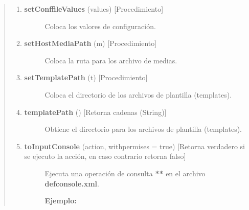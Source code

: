 \documentclass[letterpaper,11pt,spanish]{sphinxmanual}
\begin{document}
\begin{quote}
\begin{enumerate}
\begin{description}
\end{description}

\item {} \begin{description}
\item[{\textbf{setConffileValues} (values) {[}Procedimiento{]}}] \leavevmode
Coloca los valores de configuración.

\end{description}

\item {} \begin{description}
\item[{\textbf{setHostMediaPath} (m) {[}Procedimiento{]}}] \leavevmode
Coloca la ruta para los archivo de medias.

\end{description}

\item {} \begin{description}
\item[{\textbf{setTemplatePath} (t) {[}Procedimiento{]}}] \leavevmode
Coloca el directorio de los archivos de plantilla (templates).

\end{description}

\item {} \begin{description}
\item[{\textbf{templatePath} () {[}Retorna cadenas (String){]}}] \leavevmode
Obtiene el directorio para los archivos de plantilla (templates).

\end{description}

\item {} \begin{description}
\item[{\textbf{toInputConsole} (action, withpermises = true) {[}Retorna verdadero si se ejecuto la acción, en caso contrario retorna falso{]}}] \leavevmode
Ejecuta una operación de consulta \textbf{**} en el archivo \textbf{defconsole.xml}.

\textbf{Ejemplo:}


\end{description}
\end{enumerate}
\end{quote}
\end{document}
